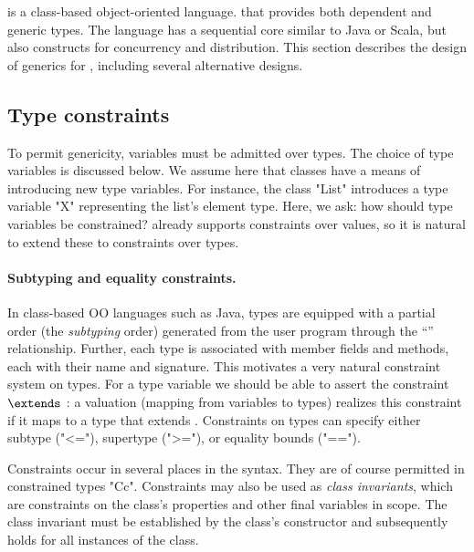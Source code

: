 \Xten{} is a class-based object-oriented language.
that provides both dependent and generic types.
The language has a sequential core similar to Java or Scala, but
also
constructs for concurrency and distribution.
This section describes the design of generics for \Xten,
including several alternative designs.


\subsection{Type constraints}

To permit genericity, variables  must be admitted over types.
The choice of type variables is discussed below.  We assume here
that classes have a means of introducing new type variables.
For instance,
the class \xcd"List" introduces a type variable \xcd"X"
representing the list's element type.
Here, we ask: how should type variables be constrained?
\Xten already supports constraints over values, so it is natural
to extend these to constraints over types.

\paragraph{Subtyping and equality constraints.}
In class-based OO languages such as Java,
types are equipped with a partial
order (the \emph{subtyping} order) generated from the user program
through the ``'' relationship.  Further, each type is
associated with member fields and methods, each with their
name and signature.
This motivates a very natural constraint system on types.  For a type
variable  we should be able to assert the constraint 
$\extends$ : a valuation (mapping from variables to types) realizes
this constraint if it maps  to a type that extends .
Constraints on types can specify either subtype (\xcd"<="),
supertype (\xcd">="), or equality bounds (\xcd"==").

Constraints occur in several places in the \Xten syntax.  They
are of course permitted in constrained types \xcd"C{c}".
Constraints may also be used as \emph{class invariants}, 
which are constraints on the class's properties and other
final variables in scope.
The class invariant must be established by the class's
constructor and subsequently holds for all instances of the
class.

